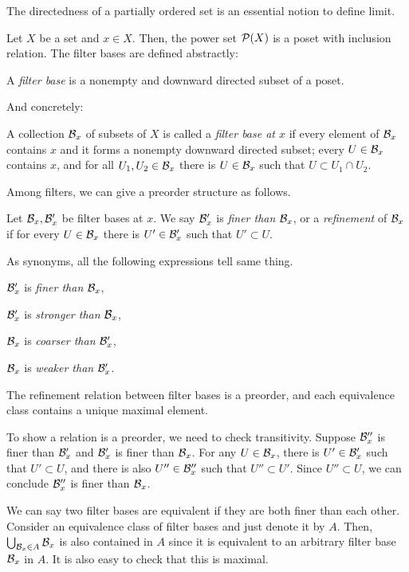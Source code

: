 \documentclass{../crs}
\begin{document}
The directedness of a partially ordered set is an essential notion to define limit.

Let $X$ be a set and $x\in X$.
Then, the power set $\mathcal{P}(X)$ is a poset with inclusion relation.
The filter bases are defined abstractly:
\begin{defn}
A \emph{filter base} is a nonempty and downward directed subset of a poset.
\end{defn}
And concretely:
\begin{defn}
A collection $\mathcal{B}_x$ of subsets of $X$ is called a \emph{filter base at $x$} if every element of $\mathcal{B}_x$ contains $x$ and it forms a nonempty downward directed subset; every $U\in\mathcal{B}_x$ contains $x$, and for all $U_1,U_2\in\mathcal{B}_x$ there is $U\in\mathcal{B}_x$ such that $U\subset U_1\cap U_2$.
\end{defn}

Among filters, we can give a preorder structure as follows.

\begin{defn}
Let $\mathcal{B}_x,\mathcal{B}'_x$ be filter bases at $x$.
We say $\mathcal{B}'_x$ is \emph{finer than} $\mathcal{B}_x$, or a \emph{refinement} of $\mathcal{B}_x$ if for every $U\in\mathcal{B}_x$ there is $U'\in\mathcal{B}'_x$ such that $U'\subset U$.
\end{defn}

As synonyms, all the following expressions tell same thing.
\begin{cond}
\item $\mathcal{B}'_x$ is \emph{finer than} $\mathcal{B}_x$,
\item $\mathcal{B}'_x$ is \emph{stronger than} $\mathcal{B}_x$,
\item $\mathcal{B}_x$ is \emph{coarser than} $\mathcal{B}'_x$,
\item $\mathcal{B}_x$ is \emph{weaker than} $\mathcal{B}'_x$.
\end{cond}

\begin{prop}
The refinement relation between filter bases is a preorder, and each equivalence class contains a unique maximal element.
\end{prop}
\begin{pf}
To show a relation is a preorder, we need to check transitivity.
Suppose $\mathcal{B}''_x$ is finer than $\mathcal{B}'_x$ and $\mathcal{B}'_x$ is finer than $\mathcal{B}_x$.
For any $U\in\mathcal{B}_x$, there is $U'\in\mathcal{B}'_x$ such that $U'\subset U$, and there is also $U''\in\mathcal{B}''_x$ such that $U''\subset U'$.
Since $U''\subset U$, we can conclude $\mathcal{B}''_x$ is finer than $\mathcal{B}_x$.

We can say two filter bases are equivalent if they are both finer than each other.
Consider an equivalence class of filter bases and just denote it by $A$.
Then, $\bigcup_{\mathcal{B}_x\in A}\mathcal{B}_x$ is also contained in $A$ since it is equivalent to an arbitrary filter base $\mathcal{B}_x$ in $A$.
It is also easy to check that this is maximal.
\end{pf}
\end{document}
